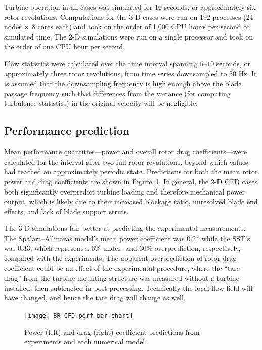 \documentclass[aip,graphicx]{revtex4-1}
\begin{document}
Turbine operation in all cases was simulated for 10 seconds, or approximately
six rotor revolutions. Computations for the 3-D cases were run on 192 processes
(24 nodes $\times$ 8 cores each) and took on the order of 1,000 CPU hours per
second of simulated time. The 2-D simulations were run on a single processor and
took on the order of one CPU hour per second.

Flow statistics were calculated over the time interval spanning $5$--$10$
seconds, or approximately three rotor revolutions, from time series downsampled
to 50 Hz. It is assumed that the downsampling frequency is high enough above the
blade passage frequency such that differences from the variance (for computing
turbulence statistics) in the original velocity will be negligible.


\subsection{Performance prediction}

Mean performance quantities---power and overall rotor drag coefficients---were
calculated for the interval after two full rotor revolutions, beyond which
values had reached an approximately periodic state. Predictions for both the
mean rotor power and drag coefficients are shown in
Figure~\ref{fig:br-cfd-perf-bar-chart}. In general, the 2-D CFD cases both
significantly overpredict turbine loading and therefore mechanical power output,
which is likely due to their increased blockage ratio, unresolved blade end
effects, and lack of blade support struts.

The 3-D simulations fair better at predicting the experimental measurements. The
Spalart--Allmaras model's mean power coefficient was 0.24 while the SST's was
0.33, which represent a 6\% under- and 30\% overprediction, respectively,
compared with the experiments. The apparent overprediction of rotor drag
coefficient could be an effect of the experimental procedure, where the ``tare
drag'' from the turbine mounting structure was measured without a turbine
installed, then subtracted in post-processing. Technically the local flow field
will have changed, and hence the tare drag will change as well.

\begin{figure}
    \centering
    
    \texttt{[image: BR-CFD\_perf\_bar\_chart]}
    
    \caption{Power (left) and drag (right) coefficient predictions from
        experiments and each numerical model.}
    
    \label{fig:br-cfd-perf-bar-chart}
\end{figure}
\end{document}
